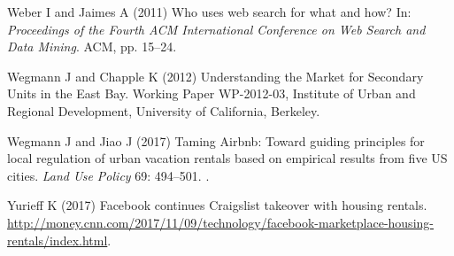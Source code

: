 \documentclass[11pt,letterpaper]{article}
\begin{document}
\begin{thebibliography}{77}
	Weber I and Jaimes A (2011) Who uses web search for what and how?
	\newblock In: \emph{Proceedings of the Fourth {ACM} International Conference on
		{Web} Search and Data Mining}. ACM, pp. 15--24.
	
	Wegmann J and Chapple K (2012) Understanding the {Market} for {Secondary}
	{Units} in the {East} {Bay}.
	\newblock Working {Paper} WP-2012-03, Institute of Urban and Regional
	Development, University of California, Berkeley.
	
	Wegmann J and Jiao J (2017) Taming {Airbnb}: {Toward} guiding principles for
	local regulation of urban vacation rentals based on empirical results from
	five {US} cities.
	\newblock \emph{Land Use Policy} 69: 494--501.
	\newblock {}.
	
	Yurieff K (2017) Facebook continues {Craigslist} takeover with housing rentals.
	\newblock
	\urlprefix\url{http://money.cnn.com/2017/11/09/technology/facebook-marketplace-housing-rentals/index.html}.
	
\end{thebibliography}
\end{document}
